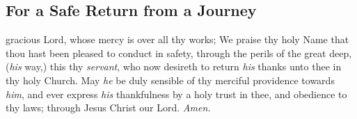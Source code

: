 \subsection{For a Safe Return from a Journey}
 gracious Lord, whose mercy is over all thy works; We praise thy holy Name that thou hast been pleased to conduct in safety, through the perils of the great deep, (\textit{his} way,) this thy \textit{servant}, who now desireth to return \textit{his} thanks unto thee in thy holy Church. May \textit{he} be duly sensible of thy merciful providence towards \textit{him}, and ever express \textit{his} thankfulness by a holy trust in thee, and obedience to thy laws; through Jesus Christ our Lord. \textit{Amen.}
